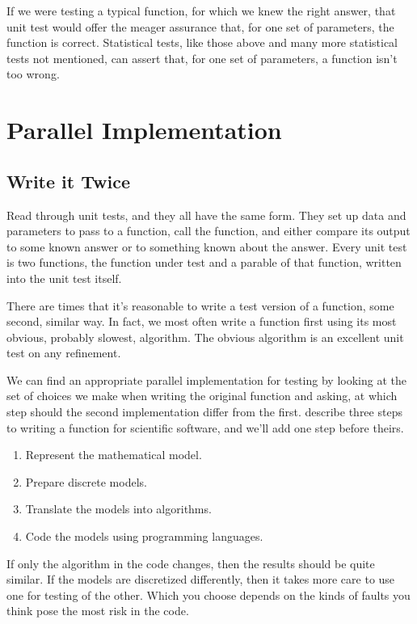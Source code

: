 \documentclass[fleqn,10pt]{olplainarticle}
\begin{document}
If we were testing a typical function, for which we knew the
right answer, that unit test would offer the meager assurance that,
for one set of parameters, the function is correct.
Statistical tests, like those above and many more statistical
tests not mentioned, can assert that, for one set of parameters,
a function isn't too wrong.


\section{Parallel Implementation}\label{sec:parallel-implementation}
\subsection{Write it Twice}
Read through unit tests, and they all have the same form.
They set up data and parameters to pass to a function, call the
function, and either compare its output to some known answer or to
something known about the answer. Every unit test is two
functions, the function under test and a parable
of that function, written into the unit test itself.

There are times that it's reasonable to write a test version
of a function, some second, similar way. In fact, we most often write
a function first using its most obvious, probably slowest, algorithm.
The obvious algorithm is an excellent unit test on any refinement.

We can find an appropriate parallel implementation for testing by
looking at the set of choices we make when writing the original function
and asking, at which step should the second implementation differ
from the first.
\cite{dahlgren2005} describe three steps to writing a function for
scientific software, and we'll add one step before theirs.
\begin{enumerate}
  \item Represent the mathematical model.
  \item Prepare discrete models.
  \item Translate the models into algorithms.
  \item Code the models using programming languages.
\end{enumerate}
If only the algorithm in the code changes, then the results
should be quite similar. If the models are discretized differently,
then it takes more care to use one for testing of the other.
Which you choose depends on the kinds of faults you think pose
the most risk in the code.
\end{document}

